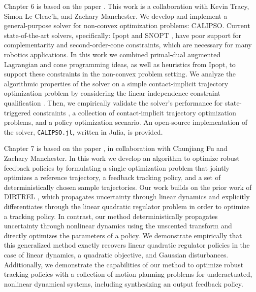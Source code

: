 Chapter 6 is based on the paper \cite{howell2022calipso}. This work is a collaboration with Kevin Tracy, Simon Le Cleac'h, and Zachary Manchester. We develop and implement a general-purpose solver for non-convex optimization problems: CALIPSO. Current state-of-the-art solvers, specifically: Ipopt \cite{wachter2006implementation} and SNOPT \cite{gill2005snopt}, have poor support for complementarity and second-order-cone constraints, which are necessary for many robotics applications. In this work we combined primal-dual augmented Lagrangian \cite{gill2012primal} and cone programming \cite{vandenberghe2010cvxopt} ideas, as well as heuristics from Ipopt, to support these constraints in the non-convex problem setting. We analyze the algorithmic properties of the solver on a simple contact-implicit trajectory optimization problem \cite{posa2014direct} by considering the linear independence constraint qualification \cite{izmailov2012global}. Then, we empirically validate the solver's performance for state-triggered constraints \cite{szmuk2020successive}, a collection of contact-implicit trajectory optimization problems, and a policy optimization scenario. An open-source implementation of the solver, \texttt{CALIPSO.jl}, written in Julia, is provided.

Chapter 7 is based on the paper \cite{howell2021direct}, in collaboration with Chunjiang Fu and Zachary Manchester. In this work we develop an algorithm to optimize robust feedback policies by formulating a single optimization problem that jointly optimizes a reference trajectory, a feedback tracking policy, and a set of deterministically chosen sample trajectories. Our work builds on the prior work of DIRTREL \cite{manchester2019robust}, which propagates uncertainty through linear dynamics and explicitly differentiates through the linear quadratic regulator problem in order to optimize a tracking policy. In contrast, our method deterministically propagates uncertainty through nonlinear dynamics using the unscented transform \cite{julier2004unscented} and directly optimizes the parameters of a policy. We demonstrate empirically that this generalized method exactly recovers linear quadratic regulator \cite{kalman1964lqr} policies in the case of linear dynamics, a quadratic objective, and Gaussian disturbances. Additionally, we demonstrate the capabilities of our method to optimize robust tracking policies with a collection of motion planning problems for underactuated, nonlinear dynamical systems, including synthesizing an output feedback policy.


